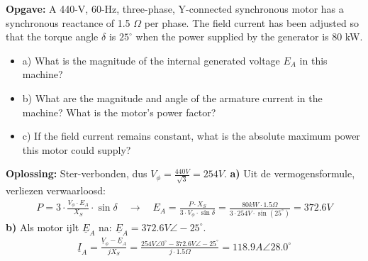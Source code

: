 \begin{oefenblok}
\textbf{Opgave:}
\newline
A 440-V, 60-Hz, three-phase, Y-connected synchronous motor has a synchronous reactance of
1.5 $\Omega$ per phase.
The field current has been adjusted so that the torque angle $\delta$ is $25^\circ$ when
the power supplied by the generator is 80 kW.
\begin{itemize}
 \item a) What is the magnitude of the internal generated voltage $E_A$ in this machine?
 \item b) What are the magnitude and angle of the armature current in the machine?
 What is the motor's power factor?
 \item c) If the field current remains constant, what is the absolute maximum power this
 motor could supply?
\end{itemize}
\textbf{Oplossing:}
\newline
Ster-verbonden, dus $V_\phi = \frac{440 V}{\sqrt{3}} = 254 V$.
\newline
\textbf{a)}
Uit de vermogensformule, verliezen verwaarloosd:
\begin{align*}
    P = 3 \cdot \frac{V_\phi \cdot E_A}{X_S} \cdot \sin\delta \quad \rightarrow \quad E_A = \frac{P \cdot X_S}{3 \cdot V_\phi \cdot \sin\delta} = \frac{80 kW \cdot 1.5 \Omega}{3 \cdot 254 V \cdot \sin(25^\circ)} = 372.6 V
\end{align*}
\textbf{b)}
Als motor ijlt $\underline{E}_A$ na: $\underline{E}_A = 372.6 V \angle -25^\circ$.
\begin{align*}
    \underline{I}_A = \frac{\underline{V}_\phi - \underline{E}_A}{j X_S} = \frac{254 V \angle 0^\circ - 372.6 V \angle -25^\circ}{j \cdot 1.5 \Omega} = 118.9 A \angle 28.0^\circ
\end{align*}
\begin{figure}[H]
  \centering
\end{figure}
\end{oefenblok}
